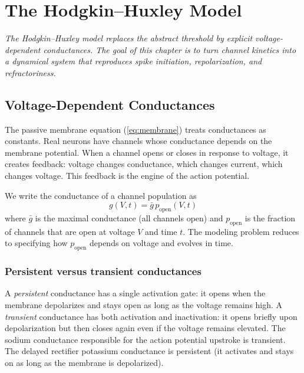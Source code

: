 \chapter{The Hodgkin--Huxley Model}
\label{ch:hodgkin-huxley}

\textit{The Hodgkin--Huxley model replaces the abstract threshold by explicit voltage-dependent conductances. The goal of this chapter is to turn channel kinetics into a dynamical system that reproduces spike initiation, repolarization, and refractoriness.}

\section{Voltage-Dependent Conductances}
\label{sec:voltage-conductances}

The passive membrane equation (\cref{eq:membrane}) treats conductances as constants. Real neurons have channels whose conductance depends on the membrane potential. When a channel opens or closes in response to voltage, it creates feedback: voltage changes conductance, which changes current, which changes voltage. This feedback is the engine of the action potential.

We write the conductance of a channel population as
%
\begin{equation}
  g(V, t) = \bar{g}\, p_{\text{open}}(V, t)
  \label{eq:conductance-gating}
\end{equation}
%
where $\bar{g}$ is the maximal conductance (all channels open) and $p_{\text{open}}$ is the fraction of channels that are open at voltage $V$ and time $t$. The modeling problem reduces to specifying how $p_{\text{open}}$ depends on voltage and evolves in time.

\subsection{Persistent versus transient conductances}

A \emph{persistent} conductance has a single activation gate: it opens when the membrane depolarizes and stays open as long as the voltage remains high. A \emph{transient} conductance has both activation and inactivation: it opens briefly upon depolarization but then closes again even if the voltage remains elevated. The sodium conductance responsible for the action potential upstroke is transient. The delayed rectifier potassium conductance is persistent (it activates and stays on as long as the membrane is depolarized).

